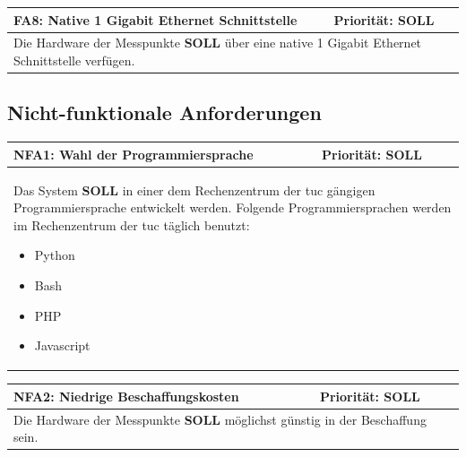 \documentclass[titlepage]{report}
\begin{document}
\begin{center}
\begin{tabular}{p{}>{\raggedleft\arraybackslash}p{}}\toprule
    \textbf{FA8: Native 1 Gigabit Ethernet Schnittstelle} & \textbf{Priorität: SOLL} \\\midrule
	\multicolumn{2}{p{\textwidth-\tabcolsep}}{%
    Die Hardware der Messpunkte \textbf{SOLL} über eine native 1 Gigabit
    Ethernet Schnittstelle verfügen.
    }\\\bottomrule
\end{tabular}
    \label{table:FA8}
\end{center}

\subsection*{Nicht-funktionale Anforderungen}
\begin{center}
\begin{tabular}{p{}>{\raggedleft\arraybackslash}p{}}\toprule
    \textbf{NFA1: Wahl der Programmiersprache} & \textbf{Priorität: SOLL} \\\midrule
	\multicolumn{2}{p{\textwidth-\tabcolsep}}{%
        Das System \textbf{SOLL} in einer dem Rechenzentrum der
        \gls{tuc} gängigen Programmiersprache entwickelt werden.
        Folgende Programmiersprachen werden im Rechenzentrum der
        \gls{tuc} täglich benutzt:
        \begin{itemize}
            \item Python
            \item Bash
            \item PHP
            \item Javascript
        \end{itemize}
    }\\\bottomrule
\end{tabular}
    \label{table:NFA1}
\end{center}
\begin{center}
\begin{tabular}{p{}>{\raggedleft\arraybackslash}p{}}\toprule
    \textbf{NFA2: Niedrige Beschaffungskosten} & \textbf{Priorität: SOLL} \\\midrule
	\multicolumn{2}{p{\textwidth-\tabcolsep}}{%
    Die Hardware der Messpunkte \textbf{SOLL} möglichst günstig in der Beschaffung
    sein.
    }\\\bottomrule
\end{tabular}
    \label{table:NFA2}
\end{center}
\end{document}

